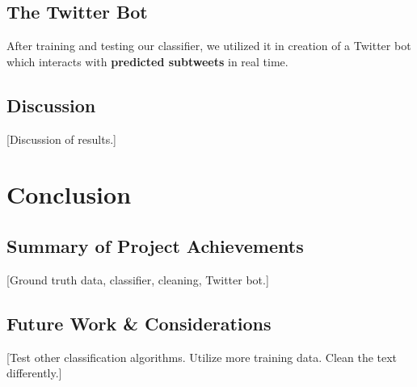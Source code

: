 \documentclass[11pt, twoside, reqno]{book}
\begin{document}
\section{The Twitter Bot}
\label{the_twitter_bot}

After training and testing our classifier, we utilized it in creation of a Twitter bot which interacts with \textbf{predicted subtweets} in real time.

\section{Discussion}
\label{discussion}

[Discussion of results.]

\chapter{Conclusion}
\label{conclusion}

\section{Summary of Project Achievements}
\label{summary}

[Ground truth data, classifier, cleaning, Twitter bot.]

\section{Future Work \& Considerations}
\label{future_work_and_considerations}

[Test other classification algorithms. Utilize more training data. Clean the text differently.]
\end{document}
